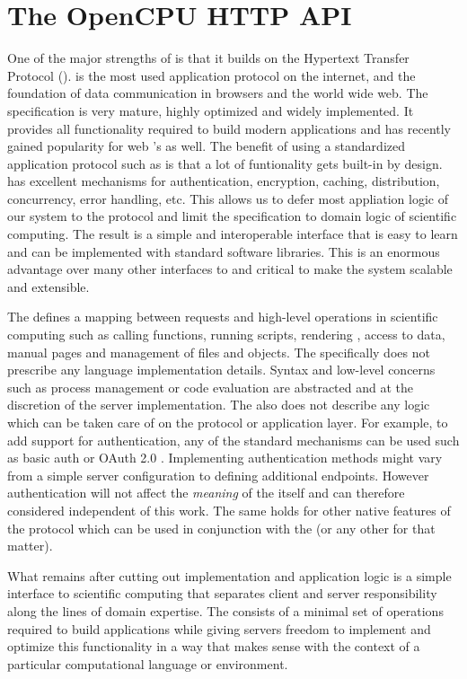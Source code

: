 \section{The OpenCPU HTTP API}

One of the major strengths of \OpenCPU is that it builds on the Hypertext Transfer Protocol (\HTTP). \HTTP is the most used application protocol on the internet, and the foundation of data communication in browsers and the world wide web. The \HTTP specification is very mature, highly optimized and widely implemented. It provides all functionality required to build modern applications and has recently gained popularity for web \API's as well. The benefit of using a standardized application protocol such as \HTTP is that a lot of funtionality gets built-in by design. \HTTP has excellent mechanisms for authentication, encryption, caching, distribution, concurrency, error handling, etc. This allows us to defer most appliation logic of our system to the protocol and limit the \API specification to domain logic of scientific computing. The result is a simple and interoperable interface that is easy to learn and can be implemented with standard \HTTP software libraries. This is an enormous advantage over many other interfaces to \R and critical to make the system scalable and extensible. 

The \OpenCPU \API defines a mapping between \HTTP requests and high-level operations in scientific computing such as calling functions, running scripts, rendering \Latex, access to data, manual pages and management of files and objects. The \API specifically does not prescribe any language implementation details. Syntax and low-level concerns such as process management or code evaluation are abstracted and at the discretion of the server implementation. The \API also does not describe any logic which can be taken care of on the protocol or application layer. For example, to add support for authentication, any of the standard mechanisms can be used such as \HTTP basic auth \citep{franks1999rfc} or OAuth 2.0 \citep{hardt2012oauth}. Implementing authentication methods might vary from a simple server configuration to defining additional endpoints. However authentication will not affect the \emph{meaning} of the \API itself and can therefore considered independent of this work. The same holds for other native features of the \HTTP protocol which can be used in conjunction with the \OpenCPU \API (or any other \HTTP \API for that matter). 

What remains after cutting out implementation and application logic is a simple interface to scientific computing that separates client and server responsibility along the lines of domain expertise. The \OpenCPU \API consists of a minimal set of operations required to build applications while giving servers freedom to implement and optimize this functionality in a way that makes sense with the context of a particular computational language or environment. 

